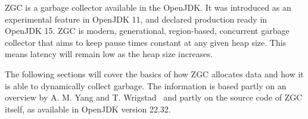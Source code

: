 
ZGC is a garbage collector available in the OpenJDK. It was introduced as an experimental feature in OpenJDK 11, and declared production ready in OpenJDK 15. ZGC is modern, generational, region-based, concurrent garbage collector that aims to keep pause times constant at any given heap size. This means latency will remain low as the heap size increases.

The following sections will cover the basics of how ZGC allocates data and how it is able to dynamically collect garbage. The information is based partly on an overview by A. M. Yang and T. Wrigstad~\cite{zgc:deep_dive} and partly on the source code of ZGC itself, as available in OpenJDK version 22.32.


